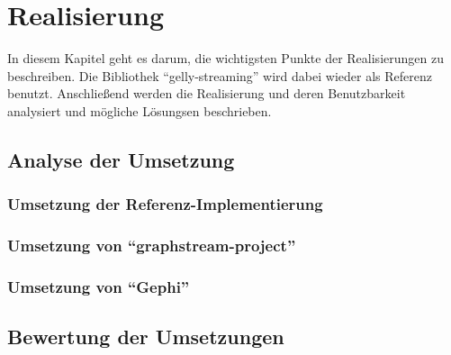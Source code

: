 \chapter{Realisierung}
In diesem Kapitel geht es darum, die wichtigsten Punkte der Realisierungen
zu beschreiben. Die Bibliothek \enquote{gelly-streaming} wird dabei wieder als
Referenz benutzt. Anschließend werden die Realisierung und deren Benutzbarkeit
analysiert und mögliche Lösungsen beschrieben.

\section{Analyse der Umsetzung}
\subsection{Umsetzung der Referenz-Implementierung}
\subsection{Umsetzung von \enquote{graphstream-project}}
\subsection{Umsetzung von \enquote{Gephi}}
\section{Bewertung der Umsetzungen}
